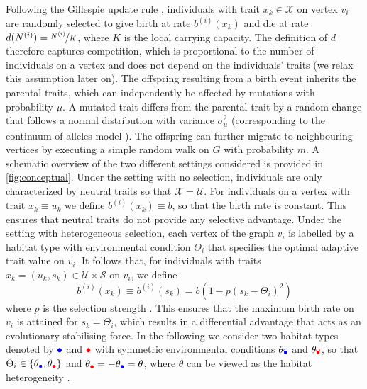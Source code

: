 Following the Gillespie update rule \citep{Gillespie1976}, individuals with trait $x_k \in \mathcal{X}$ on vertex $v_i$ are randomly selected to give birth at rate $b^{(i)}(x_k)$ and die at rate $d(N^{(i)}) = \nicefrac{N^{(i)}}{K}$, where $K$ is the local carrying capacity. 
% 
The definition of $d$ therefore captures competition, which is proportional to the number of individuals on a vertex and does not depend on the individuals' traits (we relax this assumption later on).
%
The offspring resulting from a birth event inherits the parental traits, which can independently be affected by mutations with probability $\mu$. A mutated trait differs from the parental trait by a random change that follows a normal distribution with variance $\sigma_\mu^2$ (corresponding to the continuum of alleles model \citep{Kimura1964}). The offspring can further migrate to neighbouring vertices by executing a simple random walk on $G$ with probability $m$.
%
A schematic overview of the two different settings considered is provided in \cref{fig:conceptual}. Under the setting with no selection, individuals are only characterized by neutral traits so that $\mathcal{X} = \mathcal{U}$.
%
For individuals on a vertex with trait $x_k\equiv u_k$ we define $b^{(i)}(x_k) \equiv b$, so that the birth rate is constant. This ensures that neutral traits do not provide any selective advantage.
%
Under the setting with heterogeneous selection, each vertex of the graph $v_i$ is labelled by a habitat type with environmental condition $\Theta_i$ that specifies the optimal adaptive trait value on $v_i$. It follows that, for individuals with traits $x_k = (u_k,s_k) \in \mathcal{U}\times \mathcal{S}$ on $v_i$, we define 
\begin{equation} \label{eq:birth_fun}
 b^{(i)}(x_k) \equiv b^{(i)}(s_k) = b(1 - p(s_k - \Theta_i)^2)
\end{equation}
%
where $p$ is the selection strength \citep{Mirrahimi2020}. This ensures that the maximum birth rate on $v_i$ is attained for $s_k = \Theta_i$, which results in a differential advantage that acts as an evolutionary stabilising force. In the following we consider two habitat types denoted by $\bcirc$ and $\rcirc$ with symmetric environmental conditions $\theta_\bcirc$ and $\theta_\rcirc$, so that $\Theta_i \in \{\theta_{\bcirc},\theta_{\rcirc}\}$ and $\theta_{\rcirc} = -\theta_{\bcirc} = \theta$, where $\theta$ can be viewed as the habitat heterogeneity \citep{Mirrahimi2020}.

